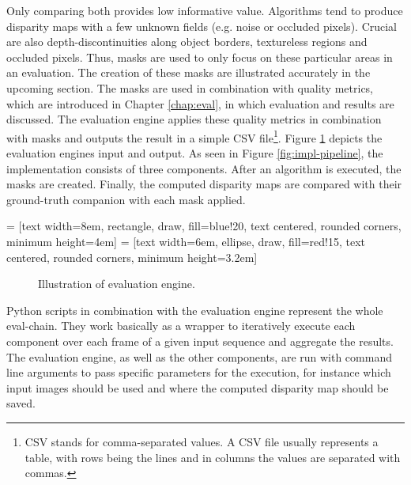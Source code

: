 Only comparing both provides low informative value.
Algorithms tend to produce disparity maps with a few unknown fields (e.g. noise or occluded pixels).
Crucial are also depth-discontinuities along object borders, textureless regions and occluded pixels.
Thus, masks are used to only focus on these particular areas in an evaluation.
The creation of these masks are illustrated accurately in the upcoming section.
The masks are used in combination with quality metrics, which are introduced in Chapter \ref{chap:eval}, in which evaluation and results are discussed.
The evaluation engine applies these quality metrics in combination with masks and outputs the result in a simple CSV file\footnote{CSV stands for comma-separated values. A CSV file usually represents a table, with rows being the lines and in columns the values are separated with commas.}.
Figure \ref{fig:impl-evaluation-engine} depicts the evaluation engines input and output.
As seen in Figure \ref{fig:impl-pipeline}, the implementation consists of three components.
After an algorithm is executed, the masks are created.
Finally, the computed disparity maps are compared with their ground-truth companion with each mask applied.

 = [text width=8em, rectangle, draw, fill=blue!20, text centered, rounded corners, minimum height=4em]
 = [text width=6em, ellipse, draw, fill=red!15, text centered, rounded corners, minimum height=3.2em]
\begin{figure}[h!]
  \centering
  \caption{Illustration of evaluation engine.}
  \label{fig:impl-evaluation-engine}
\end{figure}

\noindent Python scripts in combination with the evaluation engine represent the whole eval-chain.
They work basically as a wrapper to iteratively execute each component over each frame of a given input sequence and aggregate the results.
The evaluation engine, as well as the other components, are run with command line arguments to pass specific parameters for the execution, for instance which input images should be used and where the computed disparity map should be saved.

